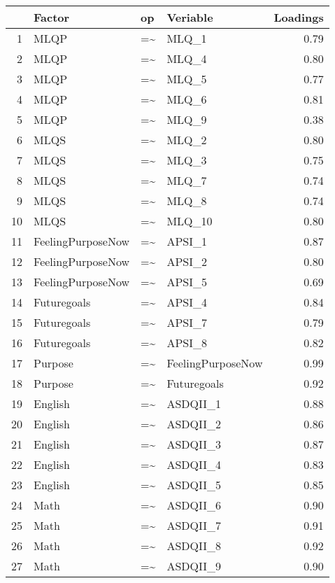 \documentclass{article}\usepackage[]{graphicx}\usepackage[]{color}
\begin{document}
\begin{table}[ht]
\tiny
\centering
\begin{tabular}{rlllr}
  \hline
 & Factor & op & Veriable & Loadings \\ 
  \hline
1 & MLQP & =\~{} & MLQ\_1 & 0.79 \\ 
  2 & MLQP & =\~{} & MLQ\_4 & 0.80 \\ 
  3 & MLQP & =\~{} & MLQ\_5 & 0.77 \\ 
  4 & MLQP & =\~{} & MLQ\_6 & 0.81 \\ 
  5 & MLQP & =\~{} & MLQ\_9 & 0.38 \\ 
  6 & MLQS & =\~{} & MLQ\_2 & 0.80 \\ 
  7 & MLQS & =\~{} & MLQ\_3 & 0.75 \\ 
  8 & MLQS & =\~{} & MLQ\_7 & 0.74 \\ 
  9 & MLQS & =\~{} & MLQ\_8 & 0.74 \\ 
  10 & MLQS & =\~{} & MLQ\_10 & 0.80 \\ 
  11 & FeelingPurposeNow & =\~{} & APSI\_1 & 0.87 \\ 
  12 & FeelingPurposeNow & =\~{} & APSI\_2 & 0.80 \\ 
  13 & FeelingPurposeNow & =\~{} & APSI\_5 & 0.69 \\ 
  14 & Futuregoals & =\~{} & APSI\_4 & 0.84 \\ 
  15 & Futuregoals & =\~{} & APSI\_7 & 0.79 \\ 
  16 & Futuregoals & =\~{} & APSI\_8 & 0.82 \\ 
  17 & Purpose & =\~{} & FeelingPurposeNow & 0.99 \\ 
  18 & Purpose & =\~{} & Futuregoals & 0.92 \\ 
  19 & English & =\~{} & ASDQII\_1 & 0.88 \\ 
  20 & English & =\~{} & ASDQII\_2 & 0.86 \\ 
  21 & English & =\~{} & ASDQII\_3 & 0.87 \\ 
  22 & English & =\~{} & ASDQII\_4 & 0.83 \\ 
  23 & English & =\~{} & ASDQII\_5 & 0.85 \\ 
  24 & Math & =\~{} & ASDQII\_6 & 0.90 \\ 
  25 & Math & =\~{} & ASDQII\_7 & 0.91 \\ 
  26 & Math & =\~{} & ASDQII\_8 & 0.92 \\ 
  27 & Math & =\~{} & ASDQII\_9 & 0.90 \\ 

\end{tabular}
\end{table}
\end{document}
